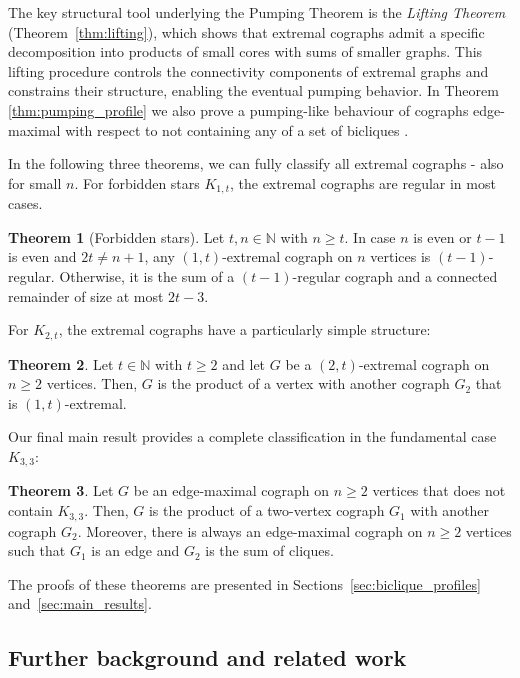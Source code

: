 \documentclass{article}
\newcommand{\NN}{\mathbb{N}}
\theoremstyle{definition}
\newtheorem{Theorem}{Theorem}
\theoremstyle{definition}
\theoremstyle{definition}
\theoremstyle{definition}
\theoremstyle{definition}
\theoremstyle{definition}
\theoremstyle{definition}
\theoremstyle{definition}
\theoremstyle{definition}
\theoremstyle{definition}
\begin{document}
The key structural tool underlying the Pumping Theorem is the \emph{Lifting Theorem} (Theorem~\ref{thm:lifting}), which shows that extremal cographs admit a specific decomposition into products of small cores with sums of smaller graphs. This lifting procedure controls the connectivity components of extremal graphs and constrains their structure, enabling the eventual pumping behavior.
In Theorem \ref{thm:pumping_profile} we also prove a pumping-like behaviour of cographs edge-maximal with respect to not containing any of a set of bicliques .

In the following three theorems, we can fully classify all extremal cographs - also for small $n$. For forbidden stars $K_{1,t}$, the extremal cographs are regular in most cases.

\begin{Theorem}[Forbidden stars] \label{thm:pumping_stars}
    Let $t,n \in \NN$ with $n \geq t$. In case $n$ is even or $t-1$ is even and $2t \neq n+1$, any $(1,t)$-extremal cograph on $n$ vertices is $(t-1)$-regular.
    Otherwise, it is the sum of a $(t-1)$-regular cograph and a connected remainder of size at most $2t - 3$.
\end{Theorem}

For $K_{2,t}$, the extremal cographs have a particularly simple structure:

\begin{Theorem} \label{thm:classification_2_t}
    Let $t \in \NN$ with $t \geq 2$ and let $G$ be a $(2,t)$-extremal cograph on $n \geq 2$ vertices.
    Then, $G$ is the product of a vertex with another cograph $G_2$ that is $(1,t)$-extremal.
\end{Theorem}

Our final main result provides a complete classification in the fundamental case $K_{3,3}$:

\begin{Theorem}\label{thm:classification_3_3}
    Let $G$ be an edge-maximal cograph on $n \geq 2$ vertices that does not contain $K_{3,3}$. Then, $G$ is the product of a two-vertex cograph $G_1$ with another cograph $G_2$. Moreover, there is always an edge-maximal cograph on $n \geq 2$ vertices such that $G_1$ is an edge and $G_2$ is the sum of cliques.
\end{Theorem}

The proofs of these theorems are presented in Sections~\ref{sec:biclique_profiles} and~\ref{sec:main_results}.

\subsection{Further background and related work}
\end{document}
